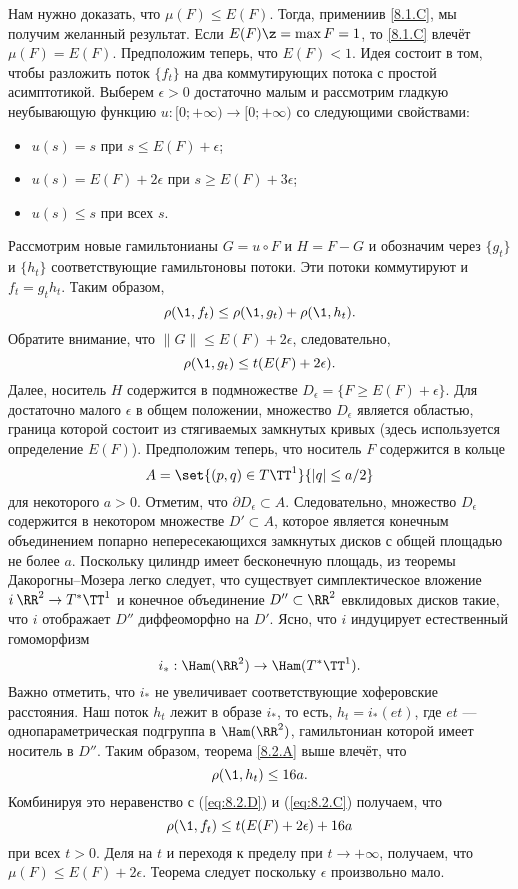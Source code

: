 Нам нужно доказать, что $\mu (F) \le E (F)$.
Тогда, примениив \ref{8.1.C}, мы получим желанный результат.
Если $E (F) \z= \max F = 1$, то \ref{8.1.C} влечёт $\mu (F) = E (F)$.
Предположим теперь, что $E (F) <1$.
Идея состоит в том, чтобы разложить поток $\{f_t\}$ на два коммутирующих потока с простой асимптотикой.
Выберем $\epsilon> 0$ достаточно малым и рассмотрим гладкую неубывающую функцию $u: [0; + \infty) \to [0; + \infty)$ со следующими свойствами: 
\begin{itemize}
\item $u (s) = s$ при $s \le E (F) + \epsilon$;
\item $u (s) = E (F) + 2\epsilon$ при $s \ge E (F) + 3\epsilon$;
\item $u (s) \le s$ при всех $s$.
\end{itemize}
Рассмотрим новые гамильтонианы $G = u \circ F$ и $H = F - G$ и обозначим через $\{g_t\}$ и $\{h_t\}$ соответствующие гамильтоновы потоки.
Эти потоки коммутируют и $f_t = g_t h_t$.
Таким образом, 
\begin{equation}\rho (\1, f_t) \le \rho (\1, g_t) + \rho (\1, h_t).
\label{eq:8.2.C}
\end{equation}
Обратите внимание, что $\| G \| \le E (F) + 2\epsilon$, следовательно, 
\begin{equation}
 \rho (\1, g_t) \le t (E (F) + 2\epsilon).
\label{eq:8.2.D}
\end{equation}
Далее, носитель $H$ содержится в подмножестве $D_\epsilon = \{F \ge E (F) + \epsilon\}$.
Для достаточно малого $\epsilon$ в общем положении, множество $D_\epsilon$ является областью, граница которой состоит из стягиваемых замкнутых кривых (здесь используется определение $E(F)$).
Предположим теперь, что носитель $F$ содержится в кольце 
\[A = \set{(p, q) \in T\TT^1}{| q | \le a / 2}\]
для некоторого $a> 0$.
Отметим, что $\partial D_\epsilon \subset A$.
Следовательно, множество $D_\epsilon$ содержится в некотором множестве $D' \subset A$, которое является конечным объединением попарно непересекающихся замкнутых дисков с общей площадью не более $a$.
Поскольку цилиндр имеет бесконечную площадь, из теоремы Дакорогны--Мозера \cite[1.6]{HZ} легко следует, что существует симплектическое вложение $i\: \RR^2 \to T^\ast \TT^1$ и конечное объединение $D'' \subset \RR^2$ евклидовых дисков такие, что $i$ отображает $D''$ диффеоморфно на $D'$.
Ясно, что $i$ индуцирует естественный гомоморфизм 
\[i_\ast: \Ham (\RR^2) \to \Ham (T^\ast \TT^1).\]
Важно отметить, что $i_\ast$ не увеличивает соответствующие хоферовские расстояния.
Наш поток $h_t$ лежит в образе $i_\ast$, то есть, $h_t = i_\ast (et)$, где $et$ --- однопараметрическая подгруппа в $\Ham (\RR^2)$, гамильтониан которой имеет носитель в $D''$.
Таким образом, теорема \ref{8.2.A} выше влечёт, что 
\[
\rho (\1, h_t) \le 16a.
\]
Комбинируя это неравенство с (\ref{eq:8.2.D}) и (\ref{eq:8.2.C}) получаем, что
\begin{equation}\rho (\1, f_t) \le t (E (F) + 2\epsilon) + 16a 
\label{eq:8.2.E} 
\end{equation}
при всех $t> 0$.
Деля на $t$ и переходя к пределу при $t \to + \infty$, получаем, что $\mu (F) \le E (F) + 2\epsilon$.
Теорема следует поскольку $\epsilon$ произвольно мало.
\qeds

